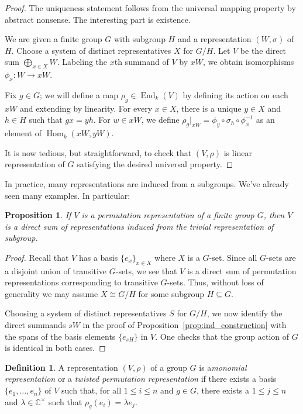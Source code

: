 \documentclass[12pt]{article}
\theoremstyle{plain}
\newtheorem{proposition}[theorem]{Proposition}
\theoremstyle{definition}
\newtheorem{definition}[theorem]{Definition}
\theoremstyle{remark}
\numberwithin{equation}{section}
\begin{document}
\begin{proof}
The uniqueness statement follows from the universal mapping property by
abstract nonsense.  The interesting part is existence.

We are given a finite group $G$ with subgroup $H$ and a representation
$(W,\sigma)$ of $H$.
Choose a system of distinct representatives $X$ for $G/H$.
Let $V$ be the direct sum $\bigoplus_{x \in X} W$.
Labeling the $x$th summand of $V$ by $xW$,
we obtain isomorphisms $\phi_x : W \to xW$.

Fix $g \in G$; we will define a map
$\rho_g \in \operatorname{End}_k(V)$ by defining its action on each $xW$
and extending by linearity.
For every $x \in X$, there is a unique $y \in X$ and $h \in H$
such that $gx=yh$.  For $w \in xW$, we define
$\rho_g|_{xW}=\phi_y \circ \sigma_h \circ \phi_x^{-1}$
as an element of $\operatorname{Hom}_k(xW,yW)$.

It is now tedious, but straightforward, to check that $(V,\rho)$ is linear
representation of $G$ satisfying the desired universal property.
\end{proof}

In practice, many representations are induced from a subgroups.  We've
already seen many examples.  In particular:

\begin{proposition}
If $V$ is a permutation representation of a finite group $G$,
then $V$ is a direct sum of representations induced from the trivial
representation of subgroup.
\end{proposition}

\begin{proof}
Recall that $V$ has a basis $\{e_x\}_{x \in X}$ where $X$ is a $G$-set.
Since all $G$-sets are a disjoint union of transitive $G$-sets,
we see that $V$ is a direct sum of permutation representations
corresponding to transitive $G$-sets.  Thus, without loss of generality
we may assume $X \cong G/H$ for some subgroup $H \subseteq G$.

Choosing a system of distinct representatives $S$ for $G/H$,
we now identify the direct summands $sW$ in the proof of
Proposition~\ref{prop:ind_construction} with the spans of
the basis elements $\{ e_{sH} \}$ in $V$.
One checks that the group action of $G$ is identical in both cases.
\end{proof}

\begin{definition}
A representation $(V,\rho)$ of a group $G$ is a\emph{monomial
representation} or a \emph{twisted permutation representation} if 
there exists a basis $\{e_1,\ldots,e_n\}$ of $V$
such that, for all $1 \le i \le n$ and $g \in G$, there exists
a $1 \le j \le n$ and $\lambda \in \mathbb{C}^\times$ such that
$\rho_g(e_i)=\lambda e_j$.
\end{definition}
\end{document}
